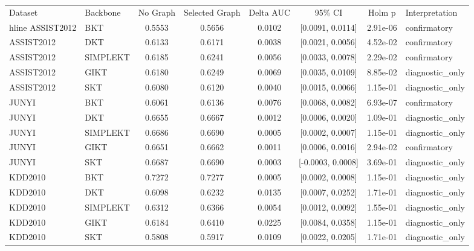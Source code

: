 \begin{tabular}{llcccccl}
\hline
Dataset & Backbone & No Graph & Selected Graph & Delta AUC & 95\% CI & Holm p & Interpretation \\
hline
ASSIST2012 & BKT & 0.5553 & 0.5656 & 0.0102 & [0.0091, 0.0114] & 2.91e-06 & confirmatory \\
ASSIST2012 & DKT & 0.6133 & 0.6171 & 0.0038 & [0.0021, 0.0056] & 4.52e-02 & confirmatory \\
ASSIST2012 & SIMPLEKT & 0.6185 & 0.6241 & 0.0056 & [0.0033, 0.0078] & 2.29e-02 & confirmatory \\
ASSIST2012 & GIKT & 0.6180 & 0.6249 & 0.0069 & [0.0035, 0.0109] & 8.85e-02 & diagnostic_only \\
ASSIST2012 & SKT & 0.6080 & 0.6120 & 0.0040 & [0.0015, 0.0066] & 1.15e-01 & diagnostic_only \\
JUNYI & BKT & 0.6061 & 0.6136 & 0.0076 & [0.0068, 0.0082] & 6.93e-07 & confirmatory \\
JUNYI & DKT & 0.6655 & 0.6667 & 0.0012 & [0.0006, 0.0020] & 1.09e-01 & diagnostic_only \\
JUNYI & SIMPLEKT & 0.6686 & 0.6690 & 0.0005 & [0.0002, 0.0007] & 1.15e-01 & diagnostic_only \\
JUNYI & GIKT & 0.6651 & 0.6662 & 0.0011 & [0.0006, 0.0016] & 2.94e-02 & confirmatory \\
JUNYI & SKT & 0.6687 & 0.6690 & 0.0003 & [-0.0003, 0.0008] & 3.69e-01 & diagnostic_only \\
KDD2010 & BKT & 0.7272 & 0.7277 & 0.0005 & [0.0002, 0.0008] & 1.15e-01 & diagnostic_only \\
KDD2010 & DKT & 0.6098 & 0.6232 & 0.0135 & [0.0007, 0.0252] & 1.71e-01 & diagnostic_only \\
KDD2010 & SIMPLEKT & 0.6312 & 0.6366 & 0.0054 & [0.0012, 0.0092] & 1.55e-01 & diagnostic_only \\
KDD2010 & GIKT & 0.6184 & 0.6410 & 0.0225 & [0.0084, 0.0358] & 1.15e-01 & diagnostic_only \\
KDD2010 & SKT & 0.5808 & 0.5917 & 0.0109 & [0.0022, 0.0205] & 1.71e-01 & diagnostic_only \\
\hline
\end{tabular}